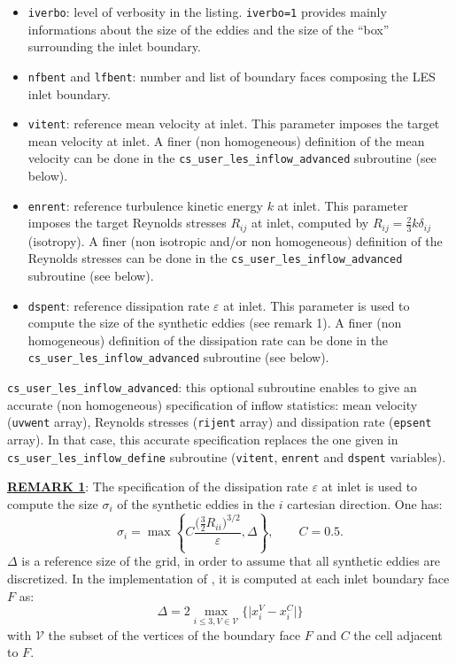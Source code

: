 {{{\begin{itemize}
\item \texttt{iverbo}: level of verbosity in the
  listing. \texttt{iverbo=1} provides mainly informations about the
  size of the eddies and the size of the ``box'' surrounding the inlet
  boundary.

\item \texttt{nfbent} and \texttt{lfbent}: number and list of boundary
  faces composing the LES inlet boundary.

\item \texttt{vitent}: reference mean velocity at inlet. This
  parameter imposes the target mean velocity at inlet. A finer (non
  homogeneous) definition of the mean velocity can be done in the
  \texttt{cs\_user\_les\_inflow\_advanced} subroutine (see below).

\item \texttt{enrent}: reference turbulence kinetic energy $k$ at
  inlet. This parameter imposes the target Reynolds stresses $R_{ij}$
  at inlet, computed by $R_{ij}=\frac{2}{3}k\delta_{ij}$ (isotropy). A
  finer (non isotropic and/or non homogeneous) definition of the
  Reynolds stresses can be done in the
  \texttt{cs\_user\_les\_inflow\_advanced} subroutine (see below).

\item \texttt{dspent}: reference dissipation rate $\varepsilon$ at
  inlet. This parameter is used to compute the size of the synthetic
  eddies (see remark 1). A finer (non homogeneous) definition of
  the dissipation rate can be done in the
  \texttt{cs\_user\_les\_inflow\_advanced} subroutine (see below).
\end{itemize}

\texttt{cs\_user\_les\_inflow\_advanced}: this optional subroutine
enables to give an accurate (non homogeneous) specification of inflow
statistics: mean velocity (\texttt{uvwent} array), Reynolds stresses
(\texttt{rijent} array) and dissipation rate (\texttt{epsent}
array). In that case, this accurate specification replaces the
one given in \texttt{cs\_user\_les\_inflow\_define} subroutine
(\texttt{vitent}, \texttt{enrent} and \texttt{dspent} variables).

{\bf \underline{REMARK 1}}: The specification of the dissipation rate
$\varepsilon$ at inlet is used to compute the size $\sigma_i$ of the
synthetic eddies in the $i$ cartesian direction. One has:
$$\sigma_i=\max\left\{C\frac{\big(\frac{3}{2}R_{ii}\big)^{3/2}}{\varepsilon},\Delta\right\},\qquad
C=0.5.$$
$\Delta$ is a reference size of the grid, in order to assume that all
synthetic eddies are discretized. In the implementation of \CS, it is
computed at each inlet boundary face $F$ as:
$$\Delta=2\max_{i\le3,V\in\mathcal{V}}\Big\{\big|x_i^V-x_i^C\big|\Big\}$$
with $\mathcal{V}$ the subset of the vertices of the boundary face $F$
and $C$ the cell adjacent to $F$.

}}}

